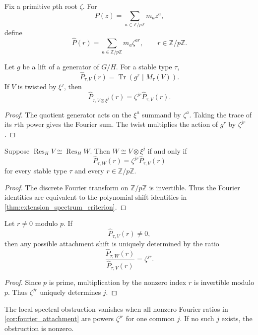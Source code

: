 \documentclass{aomart}
\theoremstyle{definition}
\theoremstyle{remark}
\newcommand{\ZZ}{\mathbb Z}
\newcommand{\Tr}{\operatorname{Tr}}
\newcommand{\Res}{\operatorname{Res}}
\begin{document}
Fix a primitive \(p\)th root \(\zeta\). For
\[
 P(z)=\sum_{a\in\ZZ/p\ZZ}m_az^a,
\]
define
\[
 \widehat P(r)
 =
 \sum_{a\in\ZZ/p\ZZ}m_a\zeta^{ar},
 \qquad
 r\in\ZZ/p\ZZ.
\]

\begin{proposition}\label{prop:fourier_trace}
Let \(g\) be a lift of a generator of \(G/H\). For a stable type \(\tau\),
\[
 \boxed{
 \widehat P_{\tau,V}(r)
 =
 \Tr\left(g^r\mid M_\tau(V)\right).
 }
\]
If \(V\) is twisted by \(\xi^j\), then
\[
 \boxed{
 \widehat P_{\tau,V\otimes\xi^j}(r)
 =
 \zeta^{jr}\widehat P_{\tau,V}(r).
 }
\]
\end{proposition}

\begin{proof}
The quotient generator acts on the \(\xi^a\) summand by \(\zeta^a\). Taking the trace of its \(r\)th power gives the Fourier sum. The twist multiplies the action of \(g^r\) by \(\zeta^{jr}\).
\end{proof}

\begin{corollary}\label{cor:fourier_attachment}
Suppose \(\Res_HV\cong\Res_HW\). Then \(W\cong V\otimes\xi^j\) if and only if
\[
 \boxed{
 \widehat P_{\tau,W}(r)
 =
 \zeta^{jr}\widehat P_{\tau,V}(r)
 }
\]
for every stable type \(\tau\) and every \(r\in\ZZ/p\ZZ\).
\end{corollary}

\begin{proof}
The discrete Fourier transform on \(\ZZ/p\ZZ\) is invertible. Thus the Fourier identities are equivalent to the polynomial shift identities in \cref{thm:extension_spectrum_criterion}.
\end{proof}

\begin{corollary}\label{cor:one_fourier_mode}
Let \(r\neq0\) modulo \(p\). If
\[
 \widehat P_{\tau,V}(r)\neq0,
\]
then any possible attachment shift is uniquely determined by the ratio
\[
 \boxed{
 \frac{\widehat P_{\tau,W}(r)}{\widehat P_{\tau,V}(r)}
 =
 \zeta^{jr}.
 }
\]
\end{corollary}

\begin{proof}
Since \(p\) is prime, multiplication by the nonzero index \(r\) is invertible modulo \(p\). Thus \(\zeta^{jr}\) uniquely determines \(j\).
\end{proof}

\begin{definition}\label{def:local_spectral_obstruction}
The local spectral obstruction vanishes when all nonzero Fourier ratios in \cref{cor:fourier_attachment} are powers \(\zeta^{jr}\) for one common \(j\). If no such \(j\) exists, the obstruction is nonzero.
\end{definition}
\end{document}
